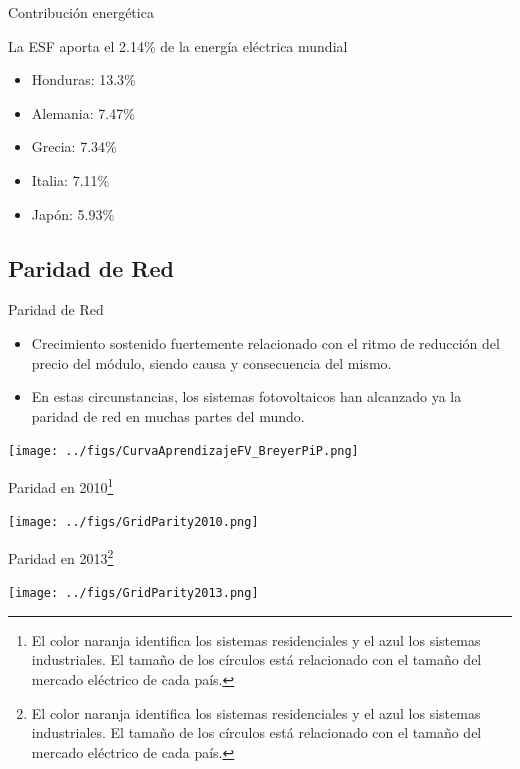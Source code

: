 \documentclass[xcolor={usenames,svgnames,dvipsnames}]{beamer}
\begin{document}
\begin{frame}[label={sec:org0b0604d}]{Contribución energética}
\begin{block}{La ESF aporta el 2.14\% de la energía eléctrica mundial}
\begin{itemize}
\item Honduras: 13.3\%
\item Alemania: 7.47\%
\item Grecia: 7.34\%
\item Italia: 7.11\%
\item Japón: 5.93\%
\end{itemize}
\end{block}
\end{frame}

\subsection{Paridad de Red}
\label{sec:orgfed7f96}

\begin{frame}[label={sec:org4e72d75}]{Paridad de Red}
\begin{itemize}
\item Crecimiento sostenido fuertemente relacionado con el ritmo de
reducción del precio del módulo, siendo causa y consecuencia del
mismo.

\item En estas circunstancias, los sistemas fotovoltaicos han alcanzado ya
la paridad de red en muchas partes del mundo.
\end{itemize}
\end{frame}


\begin{frame}[label={sec:org465c2ec}]{}
\begin{center}
\texttt{[image: ../figs/CurvaAprendizajeFV\_BreyerPiP.png]}
\end{center}
\end{frame}

\begin{frame}[label={sec:org8f09b9d}]{Paridad en 2010\footnote{El color naranja identifica los sistemas residenciales y el azul los
sistemas industriales. El tamaño de los círculos está relacionado con
el tamaño del mercado eléctrico de cada país.}}
\begin{center}
\texttt{[image: ../figs/GridParity2010.png]}
\end{center} 
\end{frame}


\begin{frame}[label={sec:orgb2f3654}]{Paridad en 2013\footnote{El color naranja identifica los sistemas residenciales y el azul los
sistemas industriales. El tamaño de los círculos está relacionado con
el tamaño del mercado eléctrico de cada país.}}
\begin{center}
\texttt{[image: ../figs/GridParity2013.png]}
\end{center}
\end{frame}
\end{document}
